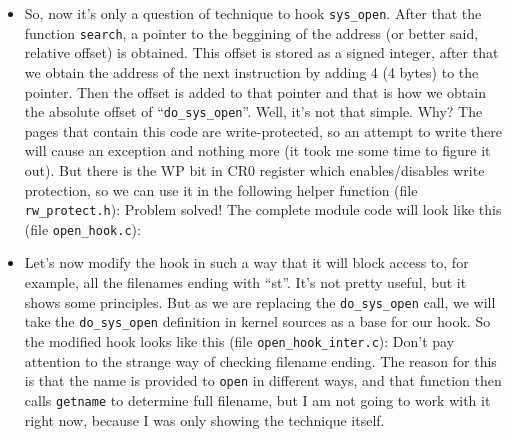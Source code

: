 \documentclass[12pt]{article}
\begin{document}
\begin{itemize}
  \item So, now it's only a question of technique to hook
    \verb!sys_open!. After that the function \verb!search!, a pointer
    to the beggining of the address (or better said, relative offset)
    is obtained. This offset is stored as a signed integer, after that
    we obtain the address of the next instruction by adding 4 (4
    bytes) to the pointer. Then the offset is added to that pointer
    and that is how we obtain the absolute offset of
    ``\verb!do_sys_open!''. Well, it's not that simple. Why? The pages
    that contain this code are write-protected, so an attempt to write
    there will cause an exception and nothing more (it took me some
    time to figure it out). But there is the WP bit in CR0 register
    which enables/disables write protection, so we can use it in the
    following helper function (file
    \verb!rw_protect.h!): Problem solved! The complete module code will look like this (file \verb!open_hook.c!): 

  \item Let's now modify the hook in such a way that it will block
    access to, for example, all the filenames ending with ``st''. It's
    not pretty useful, but it shows some principles. But as we are
    replacing the \verb!do_sys_open! call, we will take the
    \verb!do_sys_open! definition in kernel sources as a base for our
    hook. So the modified hook looks like this (file
    \verb!open_hook_inter.c!): Don't pay
    attention to the strange way of checking filename ending. The
    reason for this is that the name is provided to \verb!open! in
    different ways, and that function then calls \verb!getname! to
    determine full filename, but I am not going to work with it right
    now, because I was only showing the technique itself.
  \end{itemize}
\end{document}
